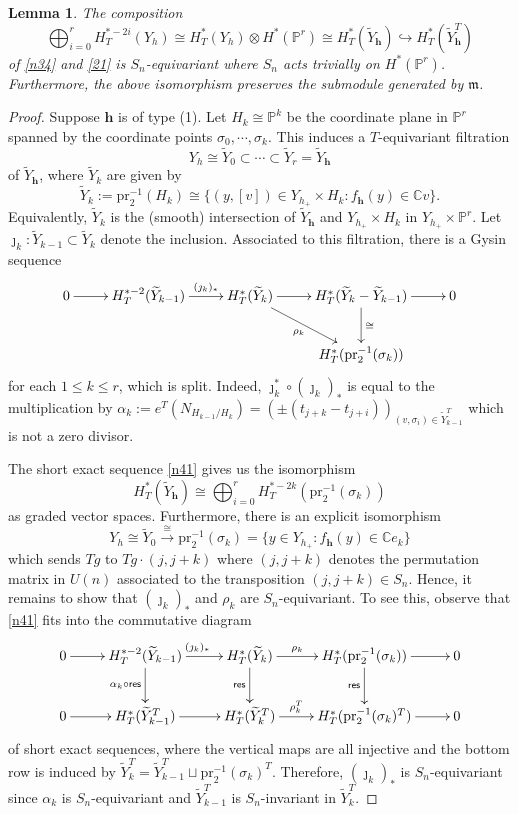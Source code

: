 \documentclass[11pt]{article}
\newtheorem{lemma}[theo]{Lemma}
\theoremstyle{definition}
\numberwithin{equation}{section}
\numberwithin{equation}{section}
\newcommand{\C}{\mathbb{C}}
\newcommand{\PP}{\mathbb{P}}
\newcommand\tY{{\widetilde{Y}}}
\newcommand\beq{\begin{equation}}
\newcommand\eeq{\end{equation}}
\newcommand\pr{\mathrm{pr}}
\newcommand\res{\mathsf{res}}
\newcommand\bh{\mathbf{h}}
\begin{document}
\begin{lemma}\label{n38}
The composition 
$$ \bigoplus_{i=0}^r H^{*-2i}_T(Y_h)\cong H^*_T(Y_h)\otimes H^*(\PP^r)\cong H^*_T(\tY_\bh)\hookrightarrow H^*_T(\tY_\bh^T)$$
of \eqref{n34} and \eqref{21} is $S_n$-equivariant where $S_n$ acts trivially on $H^*(\PP^r)$. Furthermore, the above isomorphism preserves the submodule generated by $\mathfrak{m}$.
\end{lemma}
\begin{proof}
Suppose $\bh$ is of type (1). 
	Let $H_k\cong \PP^{k}$ be the coordinate plane in $\PP^r$ spanned by the coordinate points $\sigma_0,\cdots, \sigma_k$. This induces a $T$-equivariant filtration
	\[Y_h\cong \tY_0 \subset \cdots \subset \tY_r=\tY_\bh\]  	
	of $\tY_\bh$, where $\tY_k$ are given by
	\[\tY_k:=\pr_2^{-1}(H_k)\cong\{(y,[v])\in Y_{h_+}\times H_k:f_\bh(y)\in \C v\}.\]
	Equivalently, $\tY_k$ is the (smooth) intersection of $\tY_\bh$ and $Y_{h_+}\times H_k$ in $Y_{h_+}\times \PP^r$.
	Let $\jmath_k:\tY_{k-1}\subset \tY_{k}$ denote the inclusion. Associated to this filtration, there is a Gysin sequence
\beq\label{n41}
\xymatrix{0 \ar[r]& H^{*-2}_{T}(\tY_{k-1})\ar[r]^-{~(\jmath_k)_*~} & H^*_T(\tY_{k})\ar[r]\ar[rd]_-{\rho_k}& H^*_T(\tY_k-\tY_{k-1}) \ar[r]\ar[d]^{\cong}  &0 \\ &&& H^*_T(\pr_2^{-1}(\sigma_k))&}\eeq
	for each $1\leq k\leq r$, which is split. Indeed, $\jmath_k^*\circ(\jmath_k)_*$ is equal to the multiplication by $\alpha_k:=e^T(N_{H_{k-1}/H_k})=(\pm(t_{j+k}-t_{j+i}))_{(v,\sigma_i)\in \tY_{k-1}^T}$ which is not a zero divisor. 
	
	The short exact sequence \eqref{n41} gives us the isomorphism 
	\[H^*_T(\tY_{\bh})\cong \bigoplus_{i=0}^r H^{*-2k}_T(\pr_2^{-1}(\sigma_k))\]
	as graded vector spaces. 
	Furthermore, there is an explicit isomorphism
	\beq \label{51} Y_h\cong \tY_0 \xrightarrow{~\cong ~}\pr_2^{-1}(\sigma_k)=\{y\in Y_{h_+}:f_\bh(y)\in \C e_k\}\eeq 
	which sends $Tg$ to $Tg\cdot (j,j+k)$ where $(j,j+k)$ denotes the permutation matrix in $U(n)$ associated to the transposition $(j,j+k)\in S_n$.
	Hence, it remains to show that $(\jmath_k)_*$ and $\rho_k$ are $S_n$-equivariant.  
	To see this, observe that \eqref{n41} fits into the commutative diagram
	\[\xymatrix{0 \ar[r]& H^{*-2}_{T}(\tY_{k-1})\ar[r]^{(\jmath_k)_*} \ar[d]_-{\alpha_k\circ \res }  & H^*_T(\tY_{k})\ar[r]^-{\rho_k}\ar[d]_-{\res}& H^*_T(\pr_2^{-1}(\sigma_k)) \ar[r]\ar[d]_-{\res} &0 \\ 0\ar[r]&H^{*}_{T}(\tY_{k-1}^T)\ar[r]& H^*_T(\tY_{k}^T)\ar[r]^-{\rho_k^T}& H^*_T(\pr_2^{-1}(\sigma_k)^T)\ar[r]&0}\]
	of short exact sequences, where the vertical maps are all injective and the bottom row is induced by $\tY_{k}^T=\tY_{k-1}^T \sqcup \pr_2^{-1}(\sigma_k)^T $. 
	Therefore, $(\jmath_k)_*$ is $S_n$-equivariant since $\alpha_k$ is $S_n$-equivariant and $\tY_{k-1}^T$ is $S_n$-invariant in $\tY_k^T$. 
		

\end{proof}
\end{document}
